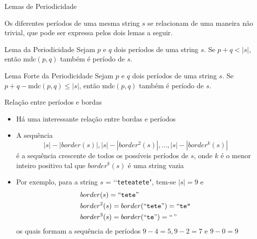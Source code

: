\begin{frame}[fragile]{Lemas de Periodicidade}

    Os diferentes períodos de uma mesma string $s$ se relacionam de uma maneira não trivial, que 
        pode ser expressa pelos dois lemas a seguir.

    \begin{block}{Lema da Periodicidade}
        Sejam $p$ e $q$ dois períodos de uma string $s$. Se $p + q < |s|$, então 
            $\mbox{mdc}(p, q)$ também é período de $s$.
    \end{block} 

    \vspace{0.1in}

    \begin{block}{Lema Forte da Periodicidade}
        Sejam $p$ e $q$ dois períodos de uma string $s$. Se $p + q - \mbox{mdc}(p, q) \leq |s|$, 
            então $\mbox{mdc}(p, q)$ também é período de $s$.
    \end{block} 

\end{frame}

\begin{frame}[fragile]{Relação entre períodos e bordas}

    \begin{itemize}
        \item Há uma interessante relação entre bordas e períodos

        \item A sequência
        \[
            |s| - |border(s)|, |s| - |border^2(s)|, ..., |s| - |border^k(s)|
        \]
        é a sequência crescente de todos os possíveis períodos de $s$, onde $k$ é o menor inteiro 
        positivo tal que $border^k(s)$ é uma string vazia

        \item Por exemplo, para a string $s$ = \lq\lq\texttt{teteatete}", tem-se $|s| = 9$ e
        \begin{align*}
            & border(s) = ``\mbox{\texttt{tete}}" \\
            & border^2(s) = border(``\mbox{\texttt{tete}}") = ``\mbox{\texttt{te"}} \\
            & border^3(s) = border(``\mbox{\texttt{te}}") = ``\,"
        \end{align*}
        os quais formam a sequência de períodos $9 - 4 = 5, 9 - 2 = 7$ e $9 - 0 = 9$
    \end{itemize}

\end{frame}

